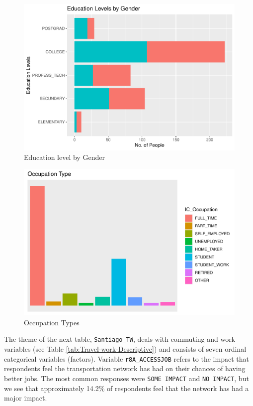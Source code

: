 \documentclass[
11pt, %
oneside, %
english, %
singlespacing, %
]{macthesis} %
\begin{document}
\begin{figure}

{\centering \includegraphics[width=0.85\linewidth]{thesis_files/figure-latex/unnamed-chunk-8-1} 

}

\caption{\label{fig:Education by gender}Education level by Gender}\label{fig:unnamed-chunk-8}
\end{figure}
\begin{figure}

{\centering \includegraphics[width=0.85\linewidth]{thesis_files/figure-latex/unnamed-chunk-9-1} 

}

\caption{\label{fig:Occupation type graph}Occupation Types}\label{fig:unnamed-chunk-9}
\end{figure}
The theme of the next table, \texttt{Santiago\_TW}, deals with commuting and work variables (see Table \ref{tab:Travel-work-Descriptive}) and consists of seven ordinal categorical variables (factors). Variable \texttt{r8A\_ACCESSJOB} refers to the impact that respondents feel the transportation network has had on their chances of having better jobs. The most common responses were \texttt{SOME\ IMPACT} and \texttt{NO\ IMPACT}, but we see that approximately 14.2\% of respondents feel that the network has had a major impact.
\end{document}
